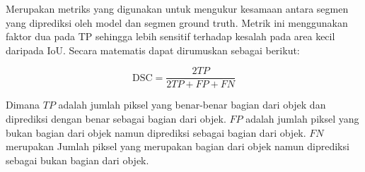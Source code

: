 \noindent Merupakan metriks yang digunakan untuk mengukur kesamaan antara segmen yang diprediksi oleh model dan segmen ground truth. Metrik ini menggunakan faktor dua pada TP sehingga lebih sensitif terhadap kesalah pada area kecil daripada IoU. Secara matematis dapat dirumuskan sebagai berikut:

\begin{equation}
	\text{DSC} =  \frac{2TP}{2TP + FP + FN}
\end{equation}

\noindent Dimana \(TP\) adalah jumlah piksel yang benar-benar bagian dari objek dan diprediksi dengan benar sebagai bagian dari objek. \(FP\) adalah jumlah piksel yang bukan bagian dari objek namun diprediksi sebagai bagian dari objek. \(FN\) merupakan Jumlah piksel yang merupakan bagian dari objek namun diprediksi sebagai bukan bagian dari objek. 



